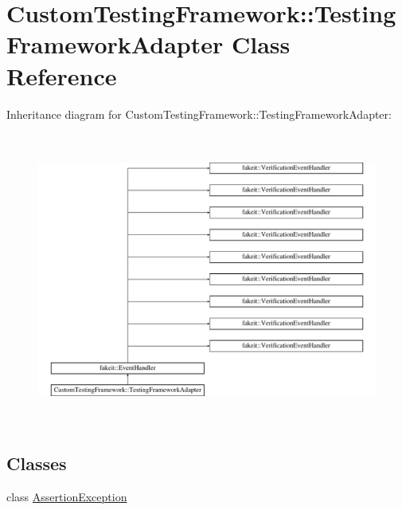 \hypertarget{classCustomTestingFramework_1_1TestingFrameworkAdapter}{}\section{Custom\+Testing\+Framework\+::Testing\+Framework\+Adapter Class Reference}
\label{classCustomTestingFramework_1_1TestingFrameworkAdapter}
Inheritance diagram for Custom\+Testing\+Framework\+::Testing\+Framework\+Adapter\+:\begin{figure}[H]
\begin{center}
\leavevmode
\includegraphics[height=9.685535cm]{classCustomTestingFramework_1_1TestingFrameworkAdapter}
\end{center}
\end{figure}
\subsection*{Classes}
\begin{DoxyCompactItemize}
\item 
class \mbox{\hyperlink{classCustomTestingFramework_1_1TestingFrameworkAdapter_1_1AssertionException}{Assertion\+Exception}}
\end{DoxyCompactItemize}

